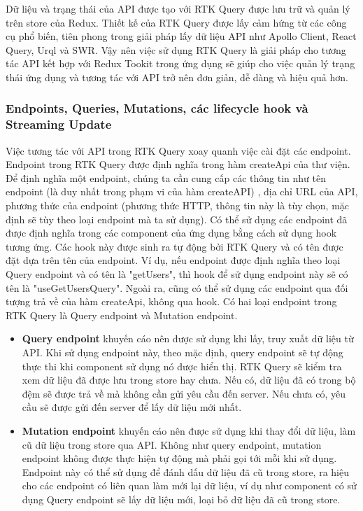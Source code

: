 Dữ liệu và trạng thái của API được tạo với RTK Query được lưu trữ và quản lý trên store của Redux.
Thiết kế của RTK Query được lấy cảm hứng từ các công cụ phổ biến, tiên phong trong giải pháp lấy dữ liệu API như Apollo Client, React Query, Urql và SWR.
Vậy nên việc sử dụng RTK Query là giải pháp cho tương tác API kết hợp với Redux Tookit trong ứng dụng sẽ giúp cho việc quản lý trạng thái ứng dụng và tương tác với API trở nên đơn giản, dễ dàng và hiệu quả hơn.

\subsubsection{Endpoints, Queries, Mutations, các lifecycle hook và Streaming Update}

\tab Việc tương tác với API trong RTK Query xoay quanh việc cài đặt các endpoint.
Endpoint trong RTK Query được định nghĩa trong hàm createApi của thư viện.
Để định nghĩa một endpoint, chúng ta cần cung cấp các thông tin như tên endpoint (là duy nhất trong phạm vi của hàm createAPI) , địa chỉ URL của API, phương thức của endpoint (phương thức HTTP, thông tin này là tùy chọn, mặc định sẽ tùy theo loại endpoint mà ta sử dụng).
Có thể sử dụng các endpoint đã được định nghĩa trong các component của ứng dụng bằng cách sử dụng hook tương ứng.
Các hook này được sinh ra tự động bởi RTK Query và có tên được đặt dựa trên tên của endpoint.
Ví dụ, nếu endpoint được định nghĩa theo loại Query endpoint và có tên là "getUsers", thì hook để sử dụng endpoint này sẽ có tên là "useGetUsersQuery".
Ngoài ra, cũng có thể sử dụng các endpoint  qua đối tượng trả về của hàm createApi, không qua hook.
Có hai loại endpoint trong RTK Query là Query endpoint và Mutation endpoint.

\begin{itemize}
  \item \textbf{Query endpoint} khuyến cáo nên được sử dụng khi lấy, truy xuất dữ liệu từ API.
        Khi sử dụng endpoint này, theo mặc định, query endpoint sẽ tự động thực thi khi component sử dụng nó được hiển thị.
        RTK Query sẽ kiểm tra xem dữ liệu đã được lưu trong store hay chưa.
        Nếu có, dữ liệu đã có trong bộ đệm sẽ được trả về mà không cần gửi yêu cầu đến server.
        Nếu chưa có, yêu cầu sẽ được gửi đến server để lấy dữ liệu mới nhất.
  \item \textbf{Mutation endpoint} khuyến cáo nên được sử dụng khi thay đổi dữ liệu, làm cũ dữ liệu trong store qua API.
        Không như query endpoint, mutation endpoint không được thực hiện tự động mà phải gọi tới mỗi khi sử dụng.
        Endpoint này có thể sử dụng để đánh dấu dữ liệu đã cũ trong store, ra hiệu cho các endpoint có liên quan làm mới lại dữ liệu, ví dụ như component có sử dụng Query endpoint sẽ lấy dữ liệu mới, loại bỏ dữ liệu đã cũ trong store.
\end{itemize}

